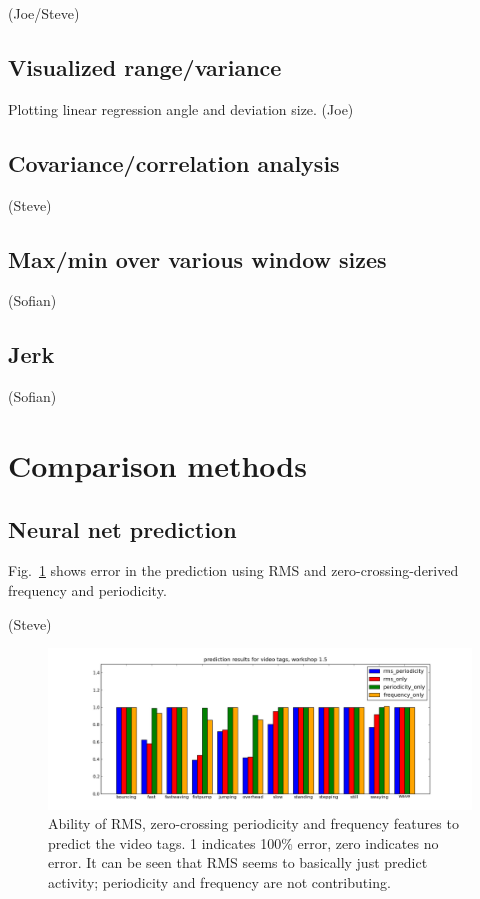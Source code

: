 \documentclass{article}
\begin{document}
(Joe/Steve)

\subsection{Visualized range/variance}

Plotting linear regression angle and deviation size. (Joe)

\subsection{Covariance/correlation analysis}

(Steve)

\subsection{Max/min over various window sizes}

(Sofian)

\subsection{Jerk}

(Sofian)

\section{Comparison methods}

\subsection{Neural net prediction}

Fig.~\ref{fig:predresults} shows error in the prediction using RMS and
zero-crossing-derived frequency and periodicity.

(Steve)

\begin{figure}
\centerline{\includegraphics[width=\textwidth]{images/predictionresults.png}}
\caption{Ability of RMS, zero-crossing periodicity and frequency
  features to predict the video tags.  1 indicates 100\% error, zero
  indicates no error.  It can be seen that RMS seems to basically just
  predict activity; periodicity and frequency are not contributing.}
\label{fig:predresults}
\end{figure}
\end{document}
